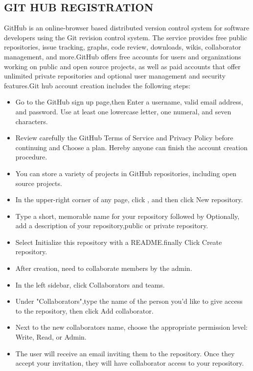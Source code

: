 \documentclass[a4paper, 12pt]{report}
\begin{document}
 
\subsection{ GIT HUB REGISTRATION}
GitHub is an online-browser based distributed version control system for software developers using the Git revision control system. The service provides free public repositories, issue tracking, graphs, code review, downloads, wikis, collaborator management, and more.GitHub offers free accounts for users and organizations working on public and open source projects, as well as paid accounts that offer unlimited private repositories and optional user management and security features.Git hub account creation includes the following steps:
 \begin{itemize}
 
 \item Go to the GitHub sign up page,then  Enter a username, valid email address, and password. Use at least one lowercase letter, one numeral, and seven characters.
 \item Review carefully the GitHub Terms of Service and Privacy Policy before continuing and Choose a plan. Hereby anyone can finish the account creation procedure.
 \item  You can store a variety of projects in GitHub repositories, including open source projects. 
 \item In the upper-right corner of any page, click , and then click New repository.
 \item Type a short, memorable name for your repository followed by Optionally, add a description of your repository,public or private repository.
 \item Select Initialize this repository with a README.finally Click Create repository.
 \item After creation, need to collaborate members by the admin. 
 \item In the left sidebar, click Collaborators and teams.
 \item Under "Collaborators",type the name of the person you'd like to give access to the repository, then click Add collaborator.
 \item Next to the new collaborators name, choose the appropriate permission level: Write, Read, or Admin. 
 \item The user will receive an email inviting them to the repository. Once they accept your invitation, they will have collaborator access to your repository.
 \end{itemize} 
\end{document}
